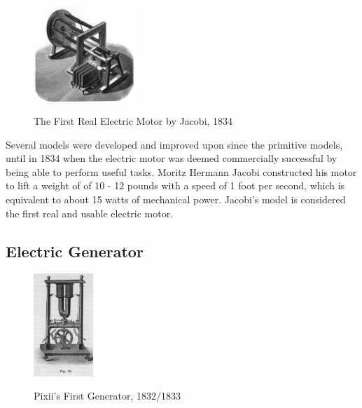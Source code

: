     \begin{figure}[!ht]
        \begin{center}
            \includegraphics[width=0.35\textwidth]{figures/history/jacobi.jpg}
            \label{fig:jacobi}
        \end{center} \caption{The First Real Electric Motor by Jacobi, 1834}
    \end{figure}

    \noindent
    Several models were developed and improved upon since the primitive models, until in 1834 when the electric motor was deemed commercially successful by being able to perform useful tasks. Moritz Hermann Jacobi constructed his motor to lift a weight of of 10 - 12 pounds with a speed of 1 foot per second, which is equivalent to about 15 watts of mechanical power. \cite{jacobi} Jacobi’s model is considered the first real and usable electric motor.

    \subsection{Electric Generator}

    \begin{figure}[!ht]
        \begin{center}
            \includegraphics[width=0.2\textwidth]{figures/history/pixii.jpg}
            \label{fig:pixii} \caption{Pixii's First Generator, 1832/1833}
        \end{center}
    \end{figure}

